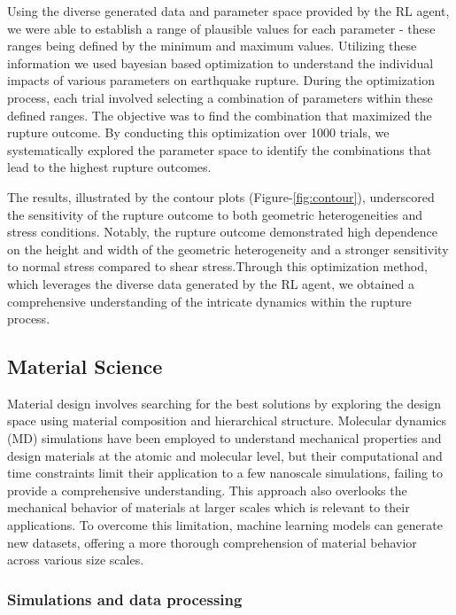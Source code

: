\documentclass{article}
\begin{document}
Using the diverse generated data and parameter space provided by the RL agent, we were able to establish a range of plausible values for each parameter - these ranges being defined by the minimum and maximum values. Utilizing these information we used bayesian based optimization to understand the individual impacts of various parameters on earthquake rupture. During the optimization process, each trial involved selecting a combination of parameters within these defined ranges. The objective was to find the combination that maximized the rupture outcome. By conducting this optimization over 1000 trials, we systematically explored the parameter space to identify the combinations that lead to the highest rupture outcomes.

The results, illustrated by the contour plots (Figure-\ref{fig:contour}), underscored the sensitivity of the rupture outcome to both geometric heterogeneities and stress conditions. Notably, the rupture outcome demonstrated high dependence on the height and width of the geometric heterogeneity and a stronger sensitivity to normal stress compared to shear stress.Through this optimization method, which leverages the diverse data generated by the RL agent, we obtained a comprehensive understanding of the intricate dynamics within the rupture process.


\subsection{Material Science}
Material design involves searching for the best solutions by exploring the design space using
material composition and hierarchical structure. Molecular dynamics (MD) simulations have been
employed to understand mechanical properties and design materials at the atomic and molecular level, but
their computational and time constraints limit their application to a few nanoscale simulations, failing to
provide a comprehensive understanding. This approach also overlooks the mechanical behavior of
materials at larger scales which is relevant to their applications. To overcome this limitation, machine
learning models can generate new datasets, offering a more thorough comprehension of material behavior
across various size scales.

\subsubsection{Simulations and data processing}
\end{document}
